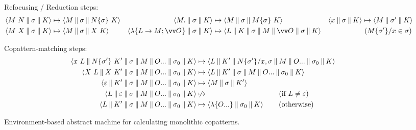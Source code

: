 
\begin{figure*}
\centering
Refocusing / Reduction steps:
\begin{align*}
  \braket{M~N \cmid \sigma \cmid K}
  &\mapsto
  \braket{M \cmid \sigma \cmid N\clos{\sigma} ~ K}
  &
  \braket{M. \cmid \sigma \cmid K}
  &\mapsto
  \braket{M \cmid \sigma \cmid M\clos{\sigma} ~ K}
  &
  \braket{x \cmid \sigma \cmid K}
  &\mapsto
  \braket{M \cmid \sigma' \cmid K}
  \\
  \braket{M~X \cmid \sigma \cmid K}
  &\mapsto
  \braket{M \cmid \sigma \cmid X ~ K}
  &
  \braket{\lambda\{L \to M; \vect{O}\} \cmid \sigma \cmid K}
  &\mapsto
  \braket{L \cmid K \cmid \sigma \cmid M \cmid \vect{O} \cmid \sigma \cmid K}
  &
  &~(\asub{x}{M\clos{\sigma'}} \in \sigma)
\end{align*}

Copattern-matching steps:
\begin{align*}
  \braket{x ~ L \cmid N\clos{\sigma'} ~ K' \cmid \sigma \cmid M \cmid \many{O} \cmid \sigma_0 \cmid K}
  &\mapsto
  \braket{L \cmid K' \cmid \asub{x}{N\clos{\sigma'}},\sigma \cmid M \cmid \many{O} \cmid \sigma_0 \cmid K}
  \\
  \braket{X ~ L \cmid X ~ K' \cmid \sigma \cmid M \cmid \many{O} \cmid \sigma_0 \cmid K}
  &\mapsto
  \braket{L \cmid K' \cmid \sigma \cmid M \cmid \many{O} \cmid \sigma_0 \cmid K}
  \\
  \braket{\varepsilon \cmid K' \cmid \sigma \cmid M \cmid \many{O} \cmid \sigma_0 \cmid K}
  &\mapsto
  \braket{M \cmid \sigma \cmid K'}
  \\
  \braket{L \cmid \varepsilon \cmid \sigma \cmid M \cmid \many{O} \cmid \sigma_0 \cmid K}
  &\not\mapsto
  \qquad\qquad\qquad\qquad\qquad
  (\text{if } L \neq \varepsilon)
  \\
  \braket{L \cmid K' \cmid \sigma \cmid M \cmid \many{O} \cmid \sigma_0 \cmid K}
  &\mapsto
  \braket{\lambda\{\many{O}\} \cmid \sigma_0 \cmid K}
  \qquad(\text{otherwise})
\end{align*}
\caption{Environment-based abstract machine for calculating monolithic copatterns.}
\label{fig:env-machine}
\end{figure*}

